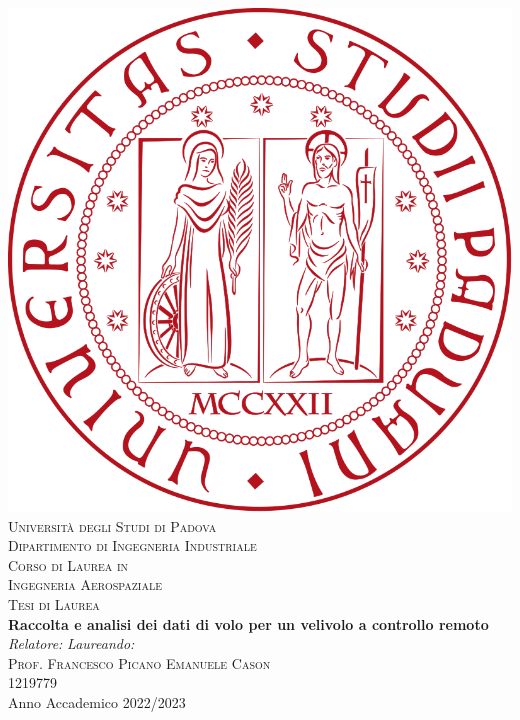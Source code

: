 \documentclass[12pt]{article}
\begin{document}
\begin{titlepage}
  \begin{center}
    \includegraphics[scale=0.1]{images/logo-unipd.png}\\

    \vspace{0.8cm}
    \textsc{\LARGE Universit\`{a} degli Studi di Padova}\\
    \vspace{0.45cm}
    \textsc{\large Dipartimento di Ingegneria Industriale}\\
    \vspace{0.4cm}
    \textsc{\large Corso di Laurea in}\\
    \textsc{\large Ingegneria Aerospaziale}\\
    \vspace{1.2cm}
    \textsc{\large Tesi di Laurea}\\
    \vfill
    { \LARGE \bfseries Raccolta e analisi dei dati di volo per un velivolo a controllo remoto
    }\\
    \vfill
    \textit{\large Relatore:} \hfill \textit{\large Laureando:}\\
    \textsc{\large Prof. Francesco Picano} \hfill \textsc{Emanuele Cason}\\
    \hfill \textsc{1219779}\\

    \vfill
    {\large Anno Accademico 2022/2023}
  \end{center}
\end{titlepage}
\end{document}
